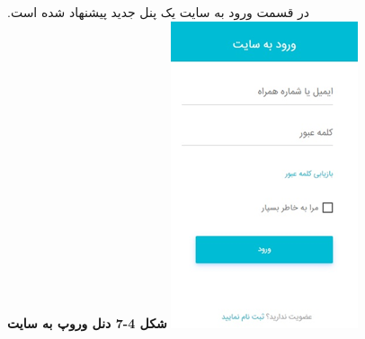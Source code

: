 \documentclass[13pt]{article}
\begin{document}
در قسمت ورود به سایت یک پنل جدید پیشنهاد شده است.
\includegraphics[width=156pt]{img-16.png}{\large  }
\textbf{{\footnotesize شکل 4-7 دنل وروپ به سایت}}
\end{document}
